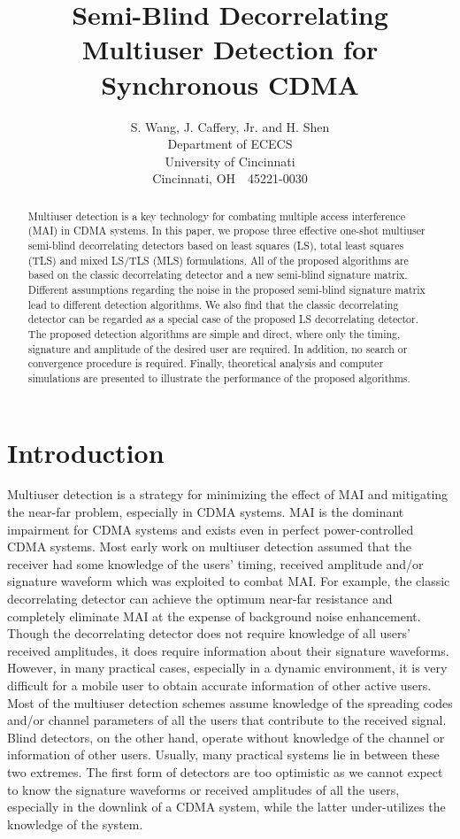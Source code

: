 \documentclass[10pt,fleqn,twocolumn]{IEEEtran}
\title{Semi-Blind Decorrelating Multiuser Detection for Synchronous CDMA}
\date{}
\author{S. Wang, J. Caffery, Jr. and H. Shen\\ Department of
ECECS \\ University of Cincinnati \\ Cincinnati, OH~~45221-0030}
\begin{document}
\maketitle

\begin{abstract}
Multiuser detection is a key technology for combating multiple
access interference (MAI) in CDMA systems. In this paper, we
propose three effective one-shot multiuser semi-blind
decorrelating detectors based on least squares (LS), total least
squares (TLS) and mixed LS/TLS (MLS) formulations. All of the
proposed algorithms are based on the classic decorrelating
detector and a new semi-blind signature matrix. Different
assumptions regarding the noise in the proposed semi-blind
signature matrix lead to different detection algorithms. We also
find that the classic decorrelating detector can be regarded as a
special case of the proposed LS decorrelating detector. The
proposed detection algorithms are simple and direct, where only
the timing, signature and amplitude of the desired user are
required. In addition, no search or convergence procedure is
required. Finally, theoretical analysis and computer simulations
are presented to illustrate the performance of the proposed
algorithms.
\end{abstract}

\section{Introduction}

Multiuser detection is a strategy for minimizing the effect of MAI
and mitigating the near-far problem, especially in CDMA systems.
MAI is the dominant impairment for CDMA systems and exists even in
perfect power-controlled CDMA systems. Most early work on
multiuser detection assumed that the receiver had some knowledge
of the users' timing, received amplitude and/or signature waveform
which was exploited to combat MAI.  For example, the classic
decorrelating detector can achieve the optimum near-far resistance
and completely eliminate MAI at the expense of background noise
enhancement. Though the decorrelating detector does not require
knowledge of all users' received amplitudes, it does require
information about their signature waveforms. However, in many
practical cases, especially in a dynamic environment, it is very
difficult for a mobile user to obtain accurate information of
other active users.
Most of the multiuser detection schemes assume knowledge of the
spreading codes and/or channel parameters of all the users that
contribute to the received signal. Blind detectors, on the other
hand, operate without knowledge of the channel or information of
other users. Usually, many practical systems lie in between these
two extremes. The first form of detectors are too optimistic as we
cannot expect to know the signature waveforms or received
amplitudes of all the users, especially in the downlink of a CDMA
system, while the latter under-utilizes the knowledge of the
system.
\end{document}

